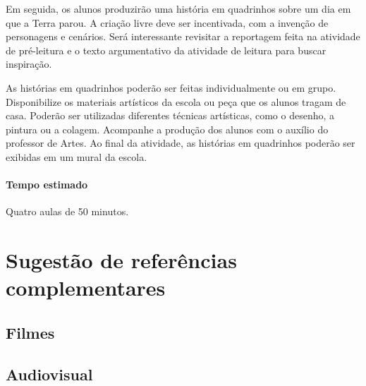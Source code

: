 \documentclass[11pt]{extarticle}
\begin{document}
Em seguida, os alunos produzirão uma história em quadrinhos sobre um dia em que a Terra parou. A criação livre deve ser incentivada, com a invenção de personagens e cenários. Será interessante revisitar a reportagem feita na atividade de pré-leitura e o texto argumentativo da atividade de leitura para buscar inspiração. 

As histórias em quadrinhos poderão ser feitas individualmente ou em grupo. Disponibilize os materiais artísticos da escola ou peça que os alunos tragam de casa. Poderão ser utilizadas diferentes técnicas artísticas, como o desenho, a pintura ou a colagem. Acompanhe a produção dos alunos com o auxílio do professor de Artes. Ao final da atividade, as histórias em quadrinhos poderão ser exibidas em um mural da escola.

\paragraph{Tempo estimado} Quatro aulas de 50 minutos.

\section{Sugestão de referências complementares}

\subsection{Filmes}

\subsection{Audiovisual}
\end{document}
